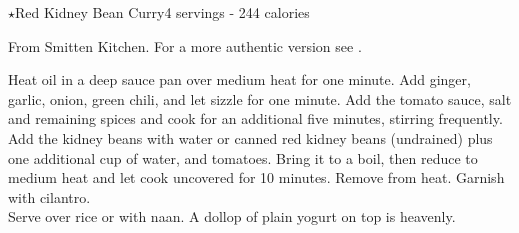 \begin{recipe}{\texorpdfstring{$\star$}{str}Red Kidney Bean Curry}{4 servings - 244 calories}{}

\freeform From Smitten Kitchen. For a more authentic version see \pageref{main:rajma_dal}.


Heat oil in a deep sauce pan over medium heat for one minute. Add ginger, garlic, onion, green chili, and let sizzle for one minute. Add the tomato sauce, salt and remaining spices and cook for an additional five minutes, stirring frequently. Add the kidney beans with water or canned red kidney beans (undrained) plus one additional cup of water, and tomatoes. Bring it to a boil, then reduce to medium heat and let cook uncovered for 10 minutes. Remove from heat. Garnish with cilantro.\\

Serve over rice or with naan. A dollop of plain yogurt on top is heavenly.

\end{recipe}